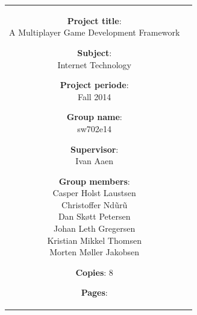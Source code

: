     \begin{tabular}{cc}
	
        \parbox[3cm]{7cm}{ %
	\vspace{7mm}
            \begin{description}
                \item {\textbf{Project title}:} \\
                    A Multiplayer Game Development Framework
                    \hspace{4cm}
                \item {\textbf{Subject}:} \\
                    Internet Technology
            \end{description}
	\vspace{-4mm}
            \parbox{8cm}{ %
                \begin{description}
                    \item {\textbf{Project periode}:} \\
                        Fall 2014
                    \hspace{4cm}
                    \item {\textbf{Group name}:} \\
                        sw702e14
                    \hspace{4cm}
                    \item {\textbf{Supervisor}:} \\
                        Ivan Aaen
                    \item {\textbf{Group members}:}\\%
                    Casper Holst Laustsen\\[0.20cm]
                    Christoffer Ndũrũ\\[0.20cm]
                    Dan Skøtt Petersen\\[0.20cm]
                    Johan Leth Gregersen\\[0.20cm]
                    Kristian Mikkel Thomsen\\[0.20cm]
                    Morten Møller Jakobsen
                \end{description}
            }
	    \vspace{-4mm}
            \begin{description}
                \item {\textbf{Copies}:} 8
                \item {\textbf{Pages}:} \pageref{LastPage}

\end{description}}
\end{tabular}

